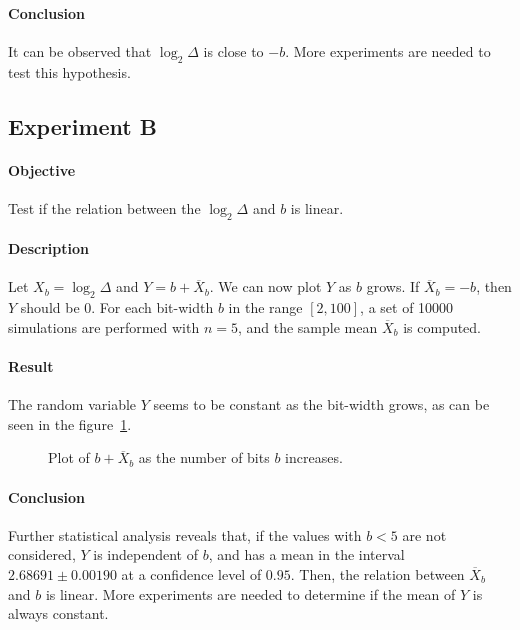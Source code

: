 \documentclass[11pt,a4paper]{article}
\begin{document}
\paragraph{Conclusion}
It can be observed that $\log_2 \Delta$ is close to $-b$. More experiments are 
needed to test this hypothesis.

\newpage
\subsection*{Experiment B}

\paragraph{Objective}
Test if the relation between the $\log_2 \Delta$ and $b$ is linear.

\paragraph{Description}
Let $X_b = \log_2 \Delta$ and $Y = b + \overline X_b$. We can now plot $Y$ as 
$b$ grows. If $\overline X_b = -b$, then $Y$ should be 0. For each bit-width $b$ 
in the range $[2, 100]$, a set of 10000 simulations are performed with $n=5$, 
and the sample mean $\overline X_b$ is computed.

\paragraph{Result}
The random variable $Y$ seems to be constant as the bit-width grows, as can be 
seen in the figure~\ref{fig:expB}.
\begin{figure}[h]
	\caption{Plot of $b + \overline X_b$ as the number of bits $b$ increases.}
	\label{fig:expB}
\end{figure}

\paragraph{Conclusion}
Further statistical analysis reveals that, if the values with $b<5$ are not 
considered, $Y$ is independent of $b$, and has a mean in the interval $2.68691 
\pm 0.00190$ at a confidence level of $0.95$. Then, the relation between 
$\overline X_b$ and $b$ is linear. More experiments are needed to determine if 
the mean of $Y$ is always constant.
\end{document}

